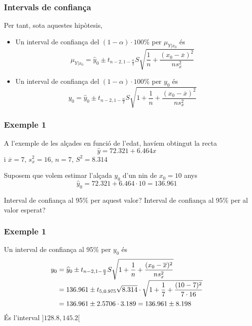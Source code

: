 \documentclass[12pt,t]{beamer}
\theoremstyle{plain}
\theoremstyle{definition}
\begin{document}
\begin{frame}
\frametitle{Intervals de confiança}
Per tant, sota aquestes hipòtesis,
\begin{itemize}
\item Un interval de confiança del $(1-\alpha)\cdot 100\%$ per $\mu_{Y|x_0}$ és
$$
\mu_{Y|x_0}=\widehat{y}_0\pm t_{n-2,1-\frac{\alpha}{2}} S\sqrt{\frac{1}{n}+\frac{(x_0-\overline{x})^2}{n
s^2_x}}
$$

\item Un interval de confiança del $(1-\alpha)\cdot 100\%$ per $y_0$ és
$$
y_0=\widehat{y}_0\pm t_{n-2,1-\frac{\alpha}{2}} S\sqrt{1+\frac{1}{n}+\frac{(x_0-\overline{x})^2}{n
s^2_x}}
$$
\end{itemize}

\end{frame}



\begin{frame}
\frametitle{Exemple 1}
\vspace*{-2ex}

A l'exemple de les alçades en funció de l'edat, havíem obtingut la recta
$$
\widehat{y}=72.321+6.464x
$$
i $\overline{x}=7$, $s_x^2=16$, $n=7$, $S^2=8.314$
\medskip

Suposem que volem estimar l'alçada $y_0$ d'un nin de $x_0=10$ anys  
$$
\widehat{y}_0=72.321+6.464\cdot 10=136.961
$$

Interval de confiança al 95\% per aquest valor? Interval de confiança al 95\% per al valor esperat?
\end{frame}



\begin{frame}
\frametitle{Exemple 1}
\vspace*{-2ex}


Un interval de confiança al 95\% per $y_0$ és
$$
\begin{array}{l}
\displaystyle
y_0=\widehat{y}_0\pm t_{n-2,1-\frac{\alpha}{2}} S\sqrt{1+\frac{1}{n}+\frac{(x_0-\overline{x})^2}{ns^2_x}}
\\[2ex]
\displaystyle\hphantom{y_0}=136.961\pm t_{5,0.975} \sqrt{8.314}\cdot\sqrt{1+\frac{1}{7}+\frac{(10-7)^2}{7\cdot 16 }}\\[2ex]
\hphantom{y_0} =
136.961\pm 2.5706 \cdot  3.189=136.961\pm  8.198
\end{array}
$$
És l'interval $]128.8,145.2[$

\end{frame}
\end{document}
